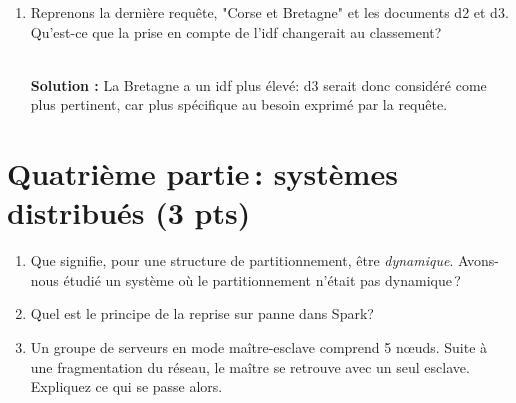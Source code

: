 \documentclass[11pt,a4paper]{article}
\newenvironment{solution}[0]{
~\\ \color{red} \textbf{Solution : }\color{black}}{%
}
\begin{document}
\begin{enumerate}
\begin{solution}
\begin{itemize}
       d4 est premier car il mentionne deux fois la Normandie.
  
  \item Alsace et Corse 
  
    d1 : $\frac{2+1}{\sqrt{5}}$; 
    d2 : $\frac{1+1}{2}$;
     d4 : $\frac{1}{\sqrt{5}}$; 
    
    d1 est premier comme on pouvait s'y attendre: il parle exclusivement
    de la Corse et de l'Alsace. Viennent ensuite d2 puis d4.
    
  \item Corse et Bretagne.
  
    d1 : $\frac{1}{\sqrt{5}}$; 
    d2 : $\frac{2}{2}$;
    d3 :  $\frac{1}{1}$  
    d4 :  $\frac{1}{\sqrt{5}}$  
    
  d2 et d3 arrivent à égalité. Intuitivement, il parlent tous les deux "à moitié"
   de Corse et de Bretagne.  d1 et d4 parlent de Corse \emph{ou} de Bretagne et aussi des autres
    pays.
 \end{itemize}

\end{solution}  
    
    \item Reprenons la dernière requête, "Corse et Bretagne" et les documents d2 et d3.
       Qu'est-ce que la prise en compte de l'idf changerait au classement?
    
\begin{solution}
La Bretagne a un idf plus élevé: d3 serait donc considéré come plus pertinent, 
car plus spécifique au besoin exprimé par la requête.
\end{solution}

  \end{enumerate}


\section*{Quatrième partie\,: systèmes distribués (3 pts)}


\begin{enumerate}

  \item Que signifie, pour  une structure de partitionnement, être \emph{dynamique}. Avons-nous
     étudié un système où le partitionnement n'était pas dynamique\,?
   
   \item Quel est le principe de la reprise sur panne dans Spark?\,
   
   \item Un groupe de serveurs en mode maître-esclave comprend 5 n{\oe}uds. Suite à une fragmentation
du réseau, le maître se retrouve  avec un seul esclave.  Expliquez ce qui se passe alors.
   
\end{enumerate}
\end{document}
